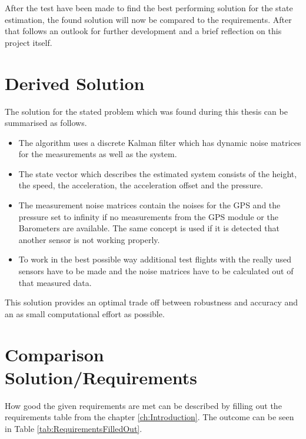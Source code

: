 After the test have been made to find the best performing solution for the state estimation,
the found solution will now be compared to the requirements.
After that follows an outlook for further development and a brief reflection on this project itself.

\section{Derived Solution}
The solution for the stated problem which was found during this thesis can be summarised as follows.
\begin{itemize}
 \item The algorithm uses a discrete Kalman filter which has dynamic noise matrices for the measurements as well as the system.
 \item The state vector which describes the estimated system consists of the height, the speed, the acceleration, the acceleration offset and the pressure.
 \item The measurement noise matrices contain the noises for the GPS and the pressure set to infinity if no measurements from the GPS module or the Barometers are available.
The same concept is used if it is detected that another sensor is not working properly.
 \item To work in the best possible way additional test flights with the really used sensors have to be made and the noise matrices have to be calculated out of that measured data.
\end{itemize}

This solution provides an optimal trade off between robustness and accuracy and an as small computational effort as possible.

\section{Comparison Solution/Requirements}
How good the given requirements are met can be described by filling out the requirements table from the chapter \ref{ch:Introduction}.
The outcome can be seen in Table \ref{tab:RequirementsFilledOut}.


